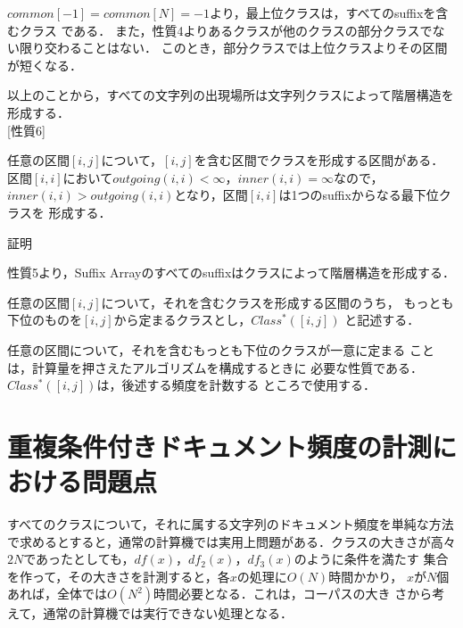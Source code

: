$common[-1]=common[N]=-1$より，最上位クラスは，すべてのsuffixを含むクラス
である．
また，性質4よりあるクラスが他のクラスの部分クラスでない限り交わることはない．
このとき，部分クラスでは上位クラスよりその区間が短くなる．\par
以上のことから，すべての文字列の出現場所は文字列クラスによって階層構造を
形成する．\\


[性質6]\par
任意の区間$[i,j]$について，$[i,j]$を含む区間でクラスを形成する区間がある．
\\

区間$[i,i]$において$outgoing(i,i)<∞$，$inner(i,i)=∞$なので，
$inner(i,i)>outgoing(i,i)$となり，区間$[i,i]$は1つのsuffixからなる最下位クラスを
形成する．\\

\par
証明\par
性質5より，Suffix Arrayのすべてのsuffixはクラスによって階層構造を形成する．
\\
\par
[記号]\par
任意の区間$[i,j]$について，それを含むクラスを形成する区間のうち，
もっとも下位のものを$[i,j]$から定まるクラスとし，$Class^{\ast}([i,j])$
と記述する．

任意の区間について，それを含むもっとも下位のクラスが一意に定まる
ことは，計算量を押さえたアルゴリズムを構成するときに
必要な性質である．$Class^{\ast}([i,j])$は，後述する頻度を計数する
ところで使用する．

\section{重複条件付きドキュメント頻度の計測における問題点}

すべてのクラスについて，それに属する文字列のドキュメント頻度を単純な方法
で求めるとすると，通常の計算機では実用上問題がある．クラスの大きさが高々
$2N$であったとしても，$df(x)$，$df_2(x)$，$df_3(x)$のように条件を満たす
集合を作って，その大きさを計測すると，各$x$の処理に$O(N)$時間かかり，
$x$が$N$個あれば，全体では$O(N^2)$時間必要となる．これは，コーパスの大き
さから考えて，通常の計算機では実行できない処理となる．\par

